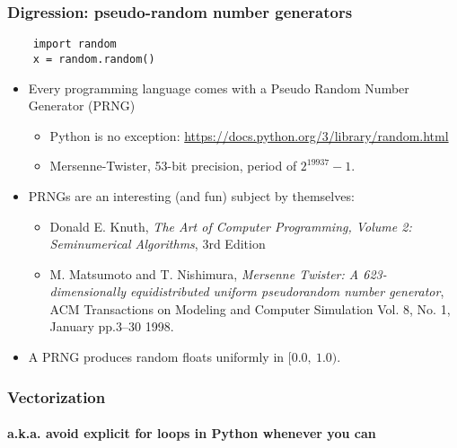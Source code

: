 \documentclass[9pt]{beamer}
\begin{document}
\begin{frame}[fragile]
  \frametitle{Digression: pseudo-random number generators}

  \begin{Verbatim}
    import random
    x = random.random()
  \end{Verbatim}

  \medskip

  \begin{itemize}
  \item Every programming language comes with a Pseudo Random Number
    Generator (PRNG)
    \begin{itemize}
    \item Python is no exception:
      \url{https://docs.python.org/3/library/random.html}
    \item Mersenne-Twister, 53-bit precision, period of $2^{19937} - 1$.
    \end{itemize}
  \item PRNGs are an interesting (and fun) subject by themselves:
    \begin{itemize}
    \item Donald E. Knuth, \emph{The Art of Computer Programming, Volume 2: Seminumerical Algorithms}, 3rd Edition
    \item M. Matsumoto and T. Nishimura, \emph{Mersenne Twister: A 623-dimensionally equidistributed uniform pseudorandom number generator}, ACM Transactions on Modeling and Computer Simulation Vol. 8, No. 1, January pp.3--30 1998.
    \end{itemize}
  \item A PRNG produces random floats uniformly in $[0.0,~1.0)$.
  \end{itemize}
\end{frame}


\begin{frame}
  \frametitle{Vectorization}
  \framesubtitle{a.k.a. avoid explicit for loops in Python whenever you can}
  
\end{frame}
\end{document}
